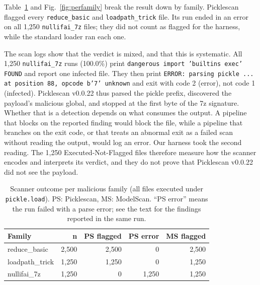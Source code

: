 \documentclass[conference]{IEEEtran}
\begin{document}
Table~\ref{tab:perfamily} and Fig.~\ref{fig:perfamily} break the result down by family. Picklescan flagged every \texttt{reduce\_basic} and \texttt{loadpath\_trick} file. Its run ended in an error on all 1,250 \texttt{nullifai\_7z} files; they did not count as flagged for the harness, while the standard loader ran each one.

The scan logs show that the verdict is mixed, and that this is systematic. All 1,250 \texttt{nullifai\_7z} runs (100.0\%) print \texttt{dangerous import 'builtins exec' FOUND} and report one infected file. They then print \texttt{ERROR: parsing pickle ... at position 88, opcode b'7' unknown} and exit with code 2 (error), not code 1 (infected). Picklescan v0.0.22 thus parsed the pickle prefix, discovered the payload's malicious global, and stopped at the first byte of the 7z signature. Whether that is a detection depends on what consumes the output. A pipeline that blocks on the reported finding would block the file, while a pipeline that branches on the exit code, or that treats an abnormal exit as a failed scan without reading the output, would log an error. Our harness took the second reading. The 1,250 Executed-Not-Flagged files therefore measure how the scanner encodes and interprets its verdict, and they do not prove that Picklescan v0.0.22 did not see the payload.

\begin{table}[!htbp]
\centering
\caption{Scanner outcome per malicious family (all files executed under \textnormal{\texttt{pickle.load}}). PS: Picklescan, MS: ModelScan. ``PS error'' means the run failed with a parse error; see the text for the findings reported in the same run.}
\label{tab:perfamily}
\footnotesize
\begin{tabular}{@{}lrrrr@{}}
\hline
\textbf{Family} & \textbf{n} & \textbf{PS flagged} & \textbf{PS error} & \textbf{MS flagged}\\
\hline
reduce\_basic & 2,500 & 2,500 & 0 & 2,500\\
loadpath\_trick & 1,250 & 1,250 & 0 & 1,250\\
nullifai\_7z & 1,250 & 0 & 1,250 & 1,250\\
\hline
\end{tabular}
\end{table}
\end{document}
